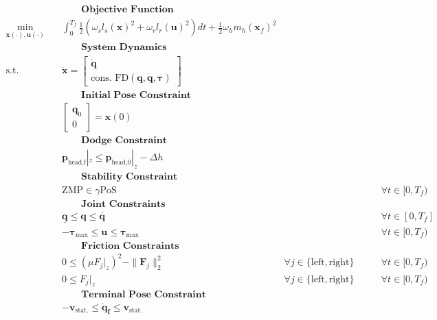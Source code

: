 \begin{subequations}
  \label{eq:morpheus:constraints}
  \begin{align}
    & \qquad \textbf{Objective Function} \nonumber \\
    \min_{\bm x(\cdot),\bm u(\cdot)} \quad
      & \int_0^{T_f} \frac 1 2 \left(\omega_s l_s(\bm x)^2 + \omega_r l_r(\bm{u})^2 \right) dt
      + \frac 1 2 \omega_h m_h(\bm x_f)^2 \label{morpheus:constraints:obj} \\
    & \qquad \textbf{System Dynamics} \nonumber \\
    \textrm{s.t.} \quad & \bm{\dot x} =
    \begin{bmatrix}
      \bm{\dot q} \\
      \text{cons. FD}(\bm q,\bm{\dot q},\bm{\tau})
    \end{bmatrix} \label{eq:morpheus:constraints:f} \\
    & \qquad \textbf{Initial Pose Constraint} \nonumber \\
    & \begin{bmatrix} \bm q_0 \\ 0 \end{bmatrix} = \bm x(0) & & \label{eq:morpheus:constraints:initialPose} \\
    & \qquad \textbf{Dodge Constraint} \nonumber \\
    & \bm p_\text{head,f}|_z \leq \bm p_\text{head,0}|_z - \Delta h & & \label{eq:morpheus:constraints:dodge} \\
    & \qquad \textbf{Stability Constraint} \nonumber \\
    & \text{ZMP} \in \gamma \text{PoS} & & \forall t \in [0,T_f) \label{eq:morpheus:constraints:stability} \\
    & \qquad \textbf{Joint Constraints} \nonumber \\
    & \bm{\underline q} \leq \bm{q} \leq \bm{\overline q} & & \forall t \in [0,T_f] \label{eq:morpheus:constraints:joint}\\
    & -\bm{\tau}_\text{max} \leq \bm u \leq \bm{\tau}_\text{max} & & \forall t \in [0,T_f)\label{eq:morpheus:constraints:torque}\\
    & \qquad \textbf{Friction Constraints} \nonumber \\
    & 0 \leq (\mu F_j|_z)^2-\|\bm{F}_j\|^2_2 & \forall j \in \{ \text{left}, \text{right} \} \qquad & \forall t \in [0,T_f) \label{eq:morpheus:constraints:F} \\
    & 0 \leq F_j|_z & \forall j \in \{ \text{left}, \text{right} \} \qquad & \forall t \in [0,T_f) \label{eq:morpheus:constraints:Fz} \\
    & \qquad \textbf{Terminal Pose Constraint} \nonumber \\
    & -\bm v_\text{stat.} \leq \bm{\dot q_f} \leq \bm v_\text{stat.} \label{eq:morpheus:constraints:terminal}
  \end{align}
\end{subequations}
